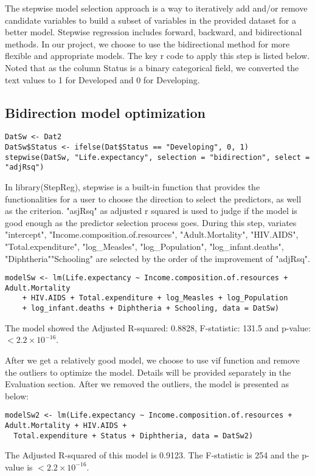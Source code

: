 The stepwise model selection approach is a way to iteratively add and/or remove candidate variables to build a subset of variables in the provided dataset for a better model. Stepwise regression includes forward, backward, and bidirectional methods. In our project, we choose to use the bidirectional method for more flexible and appropriate models. The key r code to apply this step is listed below. Noted that as the column Status is a binary categorical field, we converted the text values to 1 for Developed and 0 for Developing.

\subsection{Bidirection model optimization}

\begin{verbatim}
DatSw <- Dat2
DatSw$Status <- ifelse(Dat$Status == "Developing", 0, 1)
stepwise(DatSw, "Life.expectancy", selection = "bidirection", select = "adjRsq")
\end{verbatim}
In library(StepReg), stepwise is a built-in function that provides the functionalities for a user to choose the direction to select the predictors, as well as the criterion. "asjRsq" as adjusted r squared is used to judge if the model is good enough as the predictor selection process goes. During this step, variates "intercept", "Income.composition.of.resources", "Adult.Mortality", "HIV.AIDS", "Total.expenditure", "log\_Measles", "log\_Population", "log\_infant.deaths", "Diphtheria""Schooling" are selected by the order of the improvement of "adjRsq".

\begin{verbatim}
modelSw <- lm(Life.expectancy ~ Income.composition.of.resources + Adult.Mortality
    + HIV.AIDS + Total.expenditure + log_Measles + log_Population 
    + log_infant.deaths + Diphtheria + Schooling, data = DatSw)
\end{verbatim}
The model showed the Adjusted R-squared:  0.8828, F-statistic: 131.5 and p-value: $< 2.2\times 10^{-16}$.

After we get a relatively good model, we choose to use vif function and remove the outliers to optimize the model. Details will be provided separately in the Evaluation section. After we removed the outliers, the model is presented as below:

\begin{verbatim}
modelSw2 <- lm(Life.expectancy ~ Income.composition.of.resources + Adult.Mortality + HIV.AIDS + 
  Total.expenditure + Status + Diphtheria, data = DatSw2)
\end{verbatim}
The Adjusted R-squared of this model is 0.9123. The F-statistic is 254 and the p-value is $< 2.2\times 10^{-16}$.

